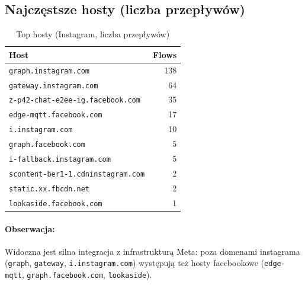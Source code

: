 \subsection{Najczęstsze hosty (liczba przepływów)}
\begin{table}[H]
  \centering
  \caption{Top hosty (Instagram, liczba przepływów)}
  \label{tab:ig-hosts}
  \begin{tabular}{lr}
    \toprule
    \textbf{Host} & \textbf{Flows} \\
    \midrule
    \texttt{graph.instagram.com} & 138 \\
    \texttt{gateway.instagram.com} & 64 \\
    \texttt{z-p42-chat-e2ee-ig.facebook.com} & 35 \\
    \texttt{edge-mqtt.facebook.com} & 17 \\
    \texttt{i.instagram.com} & 10 \\
    \texttt{graph.facebook.com} & 5 \\
    \texttt{i-fallback.instagram.com} & 5 \\
    \texttt{scontent-ber1-1.cdninstagram.com} & 2 \\
    \texttt{static.xx.fbcdn.net} & 2 \\
    \texttt{lookaside.facebook.com} & 1 \\
    \bottomrule
  \end{tabular}
\end{table}

\paragraph{Obserwacja:}
Widoczna jest silna integracja z infrastrukturą Meta: poza domenami instagrama (\texttt{graph}, \texttt{gateway}, \texttt{i.instagram.com}) występują też hosty facebookowe (\texttt{edge-mqtt}, \texttt{graph.facebook.com}, \texttt{lookaside}).  

